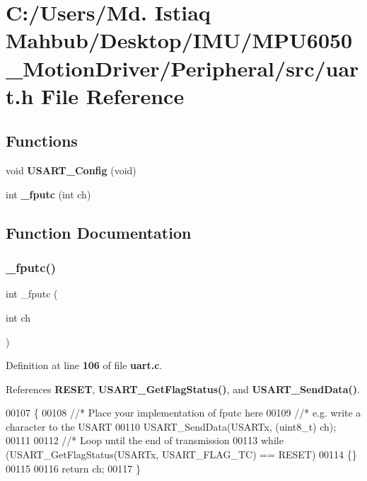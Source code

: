 \section{C\+:/\+Users/\+Md. Istiaq Mahbub/\+Desktop/\+I\+M\+U/\+M\+P\+U6050\+\_\+\+Motion\+Driver/\+Peripheral/src/uart.h File Reference}
\label{uart_8h}
\subsection*{Functions}
\begin{DoxyCompactItemize}
\item 
void \textbf{ U\+S\+A\+R\+T\+\_\+\+Config} (void)
\item 
int \textbf{ \+\_\+fputc} (int ch)
\end{DoxyCompactItemize}


\subsection{Function Documentation}
\mbox{\label{uart_8h_a7aa3de78846f1479812044ae59014146}} 
\subsubsection{\+\_\+fputc()}
{\footnotesize\ttfamily int \+\_\+fputc (\begin{DoxyParamCaption}\item[{int}]{ch }\end{DoxyParamCaption})}



Definition at line \textbf{ 106} of file \textbf{ uart.\+c}.



References \textbf{ R\+E\+S\+ET}, \textbf{ U\+S\+A\+R\+T\+\_\+\+Get\+Flag\+Status()}, and \textbf{ U\+S\+A\+R\+T\+\_\+\+Send\+Data()}.


\begin{DoxyCode}
00107 \{
00108   \textcolor{comment}{//* Place your implementation of fputc here }
00109   \textcolor{comment}{//* e.g. write a character to the USART }
00110   USART_SendData(USARTx, (uint8\_t) ch);
00111 
00112   \textcolor{comment}{//* Loop until the end of transmission }
00113   \textcolor{keywordflow}{while} (USART_GetFlagStatus(USARTx, USART_FLAG_TC) == RESET)
00114   \{\}
00115 
00116   \textcolor{keywordflow}{return} ch;
00117 \}
\end{DoxyCode}
\mbox{\label{uart_8h_ae9720bf2dbb461c28e0205b050f1a0bb}} 
